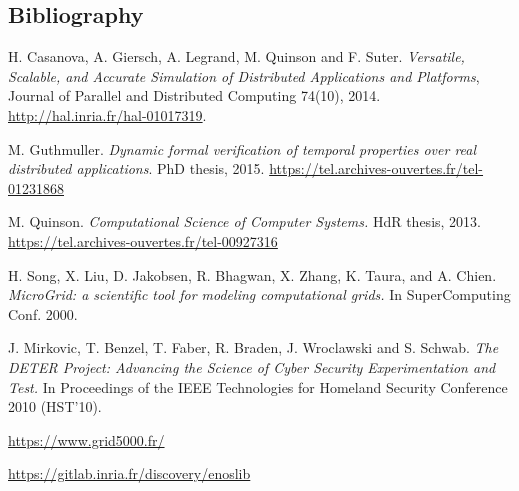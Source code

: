 \documentclass[a4paper,11pt]{article}
\begin{document}
\subsection*{Bibliography}
\begin{compactitem}
\item H. Casanova, A. Giersch, A. Legrand, M.  Quinson and F. Suter.
  \textit{Versatile, Scalable, and Accurate Simulation of Distributed
    Applications and Platforms}, Journal of Parallel and Distributed Computing
  74(10), 2014. \url{http://hal.inria.fr/hal-01017319}.
\item M. Guthmuller. \textit{Dynamic formal verification of temporal
    properties over real distributed applications}. PhD thesis,
  2015. \url{https://tel.archives-ouvertes.fr/tel-01231868}
\item M. Quinson. \textit{Computational Science of Computer Systems.}
  HdR thesis, 2013. \url{https://tel.archives-ouvertes.fr/tel-00927316}
\item H. Song, X. Liu, D. Jakobsen, R. Bhagwan, X. Zhang, K. Taura,
  and A. Chien. \textit{MicroGrid: a scientific tool for modeling
    computational grids.} In SuperComputing Conf. 2000.
\item J. Mirkovic, T. Benzel, T.  Faber, R. Braden, J. Wroclawski and
  S. Schwab. \textit{The DETER Project: Advancing the Science of Cyber
    Security Experimentation and Test.}  In Proceedings of the IEEE
  Technologies for Homeland Security Conference 2010 (HST'10).
\item \url{https://www.grid5000.fr/}
\item \url{https://gitlab.inria.fr/discovery/enoslib}
\end{compactitem}
\end{document}
